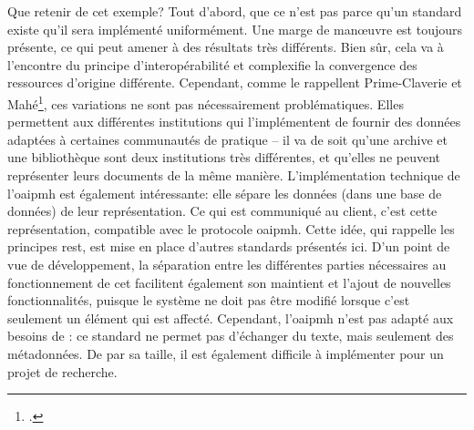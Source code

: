 Que retenir de cet exemple? Tout d'abord, que ce n'est pas parce qu'un standard existe qu'il sera implémenté uniformément. Une marge de manœuvre est toujours présente, ce qui peut amener à des résultats très différents. Bien sûr, cela va à l'encontre du principe d'interopérabilité et complexifie la convergence des ressources d'origine différente. Cependant, comme le rappellent Prime-Claverie et Mahé\footcite[p. 15-16]{prime-claverie_defi_2017}, ces variations ne sont pas nécessairement problématiques. Elles permettent aux différentes institutions qui l'implémentent de fournir des données adaptées à certaines communautés de pratique -- il va de soit qu'une archive et une bibliothèque sont deux institutions très différentes, et qu'elles ne peuvent représenter leurs documents de la même manière. L'implémentation technique de l'\gls{oaipmh} est également intéressante: elle sépare les données (dans une base de données) de leur représentation. Ce qui est communiqué au client, c'est cette représentation, compatible avec le protocole \gls{oaipmh}. Cette idée, qui rappelle les principes \gls{rest}, est mise en place d'autres standards présentés ici. D'un point de vue de développement, la séparation entre les différentes parties nécessaires au fonctionnement de cet \api{} facilitent également son maintient et l'ajout de nouvelles fonctionnalités, puisque le système ne doit pas être modifié lorsque c'est seulement un élément qui est affecté. Cependant, l'\gls{oaipmh} n'est pas adapté aux besoins de \ktb{}: ce standard ne permet pas d'échanger du texte, mais seulement des métadonnées. De par sa taille, il est également difficile à implémenter pour un projet de recherche.

